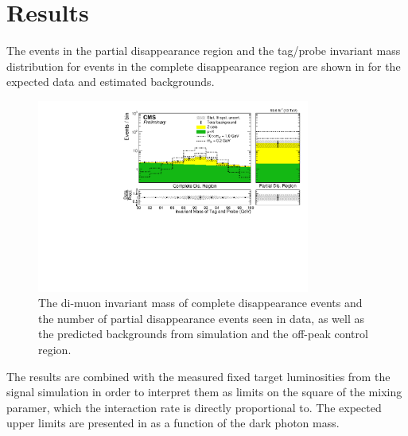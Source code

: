 \chapter{Results}
\label{results}

The events in the partial disappearance region and the tag/probe invariant mass distribution for events in the complete disappearance region are shown in  for the expected data and estimated backgrounds.

\begin{figure}[htbp]
	\centering
	\includegraphics[width=0.8\textwidth]{figures/bdtScore_partialDisappearanceBDT_0p2.pdf}
	\caption[Observed Signal Region Events]{The di-muon invariant mass of complete disappearance events and the number of partial disappearance events seen in data, as well as the predicted backgrounds from simulation and the off-peak control region.}
	\label{fig:invMassResult}
\end{figure}

The results are combined with the measured fixed target luminosities from the signal simulation in order to interpret them as limits on the square of the mixing paramer, which the \dbrem interaction rate is directly proportional to.
The expected upper limits are presented in  as a function of the dark photon mass. 

